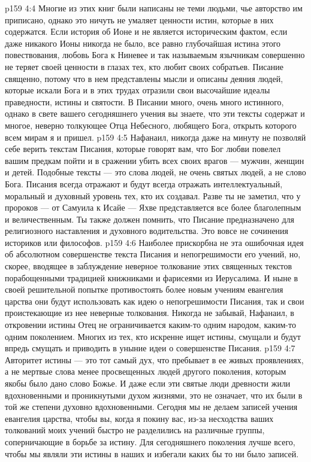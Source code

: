 \vs p159 4:4 Многие из этих книг были написаны не теми людьми, чье авторство им приписано, однако это ничуть не умаляет ценности истин, которые в них содержатся. Если история об Ионе и не является историческим фактом, если даже никакого Ионы никогда не было, все равно глубочайшая истина этого повествования, любовь Бога к Ниневее и так называемым язычникам совершенно не теряет своей ценности в глазах тех, кто любит своих собратьев. Писание священно, потому что в нем представлены мысли и описаны деяния людей, которые искали Бога и в этих трудах отразили свои высочайшие идеалы праведности, истины и святости. В Писании много, очень много истинного, однако в свете вашего сегодняшнего учения вы знаете, что эти тексты содержат и многое, неверно толкующее Отца Небесного, любящего Бога, открыть которого всем мирам я и пришел.
\vs p159 4:5 Нафанаил, никогда даже на минуту не позволяй себе верить текстам Писания, которые говорят вам, что Бог любви повелел вашим предкам пойти и в сражении убить всех своих врагов --- мужчин, женщин и детей. Подобные тексты --- это слова людей, не очень святых людей, а не слово Бога. Писания всегда отражают и будут всегда отражать интеллектуальный, моральный и духовный уровень тех, кто их создавал. Разве ты не заметил, что у пророков --- от Самуила к Исайе --- Яхве представляется все более благолепным и величественным. Ты также должен помнить, что Писание предназначено для религиозного наставления и духовного водительства. Это вовсе не сочинения историков или философов.
\vs p159 4:6 Наиболее прискорбна не эта ошибочная идея об абсолютном совершенстве текста Писания и непогрешимости его учений, но, скорее, вводящее в заблуждение неверное толкование этих священных текстов порабощенными традицией книжниками и фарисеями из Иерусалима. И ныне в своей решительной попытке противостоять более новым учениям евангелия царства они будут использовать как идею о непогрешимости Писания, так и свои проистекающие из нее неверные толкования. Никогда не забывай, Нафанаил, в откровении истины Отец не ограничивается каким\hyp{}то одним народом, каким\hyp{}то одним поколением. Многих из тех, кто искренне ищет истины, смущали и будут впредь смущать и приводить в уныние идеи о совершенстве Писания.
\vs p159 4:7 Авторитет истины --- это тот самый дух, что пребывает в ее живых проявлениях, а не мертвые слова менее просвещенных людей другого поколения, которым якобы было дано слово Божье. И даже если эти святые люди древности жили вдохновенными и проникнутыми духом жизнями, это не означает, что их  были в той же степени духовно вдохновенными. Сегодня мы не делаем записей учения евангелия царства, чтобы вы, когда я покину вас, из\hyp{}за несходства ваших толкований моих учений быстро не разделились на различные группы, соперничающие в борьбе за истину. Для сегодняшнего поколения лучше всего, чтобы мы являли эти истины в наших  и избегали каких бы то ни было записей.
